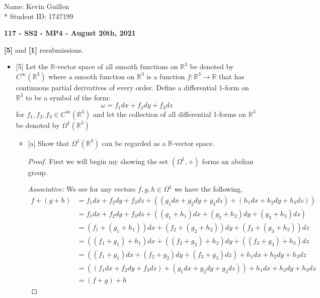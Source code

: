 \documentclass[12pt]{article}
\newcommand      {\Rm}         {{\mathbb R}}
\newcommand {\f}[1]{{#1_1 dx + #1_2 dy + #1_3 dz}}
\newcommand {\ff}[2]{{(#1_1 + #2_1) dx + (#1_2+ #2_2) dy + (#1_3 +#2_3)dz}}
\begin{document}
\begin{flushright}
    Name: Kevin Guillen \\*
    Student ID: 1747199
\end{flushright}
\begin{center}
    {\bf 117 - SS2 - MP4 - August 20th, 2021}
\end{center}
\textbf{[5]} and \textbf{[1]} resubmissions.
\begin{itemize}
    \item{[5]} Let the $\Rm$-vector space of all smooth functions on $\Rm^3$ be denoted by $C^\infty(\Rm^3)$ where a smooth function on $\Rm^3$ is a
    function $f : \Rm^3 \rightarrow \Rm$ that has continuous partial derivatives of every order. Define a differential 1-form on $\Rm^3$ to be
    a symbol of the form: \[\omega = f_1dx + f_2dy + f_3dz\]
    for $f_1,f_2,f_3\in C^\infty(\Rm^3)$ and let the collection of all differential 1-forms on $\Rm^3$ be denoted by $\Omega^1(\Rm^3)$

    \begin{itemize}
        \item{[a]} Show that $\Omega^1(\Rm^3)$ can be regarded as a $\Rm$-vector space.
        \begin{proof}
                First we will begin my showing the set $(\Omega^1,+)$ forms an abelian group.
                
                \textit{Associative:} We see for any vectors $f,g,h \in \Omega^1$ we have the following,
                \begin{align*}
                    f+(g+h) &= \f{f} + ((\f{g}) + (\f{h})) \\
                     &=\f{f} + (\ff{g}{h}) \\
                     &= (f_1 + (g_1 + h_1))dx+ (f_2 + (g_2 + h_2))dy +(f_3 + (g_3 + h_3))dz \\
                     &= ((f_1 + g_1) + h_1)dx+ ((f_2 + g_2) + h_2)dy +((f_3 + g_3) + h_3)dz \\
                     &=(\ff{f}{g}) + \f{h} \\
                     &= ((\f{f}) + (\f{g})) + \f{h} \\
                     &= (f+g) + h
                \end{align*}


\end{proof}
\end{itemize}
\end{itemize}
\end{document}
